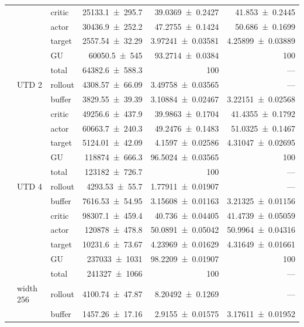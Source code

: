 {\begin{longtable}{@{}lllrrr@{}}
     &  & critic & \num{25133.1+-295.7} & \num{39.0369+-0.2427} & \num{41.853+-0.2445} \\
     &  & actor & \num{30436.9+-252.2} & \num{47.2755+-0.1424} & \num{50.686+-0.1699} \\
     &  & target & \num{2557.54+-32.29} & \num{3.97241+-0.03581} & \num{4.25899+-0.03889} \\
     &  & GU & \num{60050.5+-545} & \num{93.2714+-0.0384} & 100 \\
     &  & total & \num{64382.6+-588.3} & \num{100} & --- \\
    \addlinespace[2pt]
     & UTD 2 & rollout & \num{4308.57+-66.09} & \num{3.49758+-0.03565} & --- \\
     &  & buffer & \num{3829.55+-39.39} & \num{3.10884+-0.02467} & \num{3.22151+-0.02568} \\
     &  & critic & \num{49256.6+-437.9} & \num{39.9863+-0.1704} & \num{41.4355+-0.1792} \\
     &  & actor & \num{60663.7+-240.3} & \num{49.2476+-0.1483} & \num{51.0325+-0.1467} \\
     &  & target & \num{5124.01+-42.09} & \num{4.1597+-0.02586} & \num{4.31047+-0.02695} \\
     &  & GU & \num{118874+-666.3} & \num{96.5024+-0.03565} & 100 \\
     &  & total & \num{123182+-726.7} & \num{100} & --- \\
    \addlinespace[2pt]
     & UTD 4 & rollout & \num{4293.53+-55.7} & \num{1.77911+-0.01907} & --- \\
     &  & buffer & \num{7616.53+-54.95} & \num{3.15608+-0.01163} & \num{3.21325+-0.01156} \\
     &  & critic & \num{98307.1+-459.4} & \num{40.736+-0.04405} & \num{41.4739+-0.05059} \\
     &  & actor & \num{120878+-478.8} & \num{50.0891+-0.05042} & \num{50.9964+-0.04316} \\
     &  & target & \num{10231.6+-73.67} & \num{4.23969+-0.01629} & \num{4.31649+-0.01661} \\
     &  & GU & \num{237033+-1031} & \num{98.2209+-0.01907} & 100 \\
     &  & total & \num{241327+-1066} & \num{100} & --- \\
    \addlinespace[2pt]
     & width 256 & rollout & \num{4100.74+-47.87} & \num{8.20492+-0.1269} & --- \\
     &  & buffer & \num{1457.26+-17.16} & \num{2.9155+-0.01575} & \num{3.17611+-0.01952} \\

\end{longtable}}
